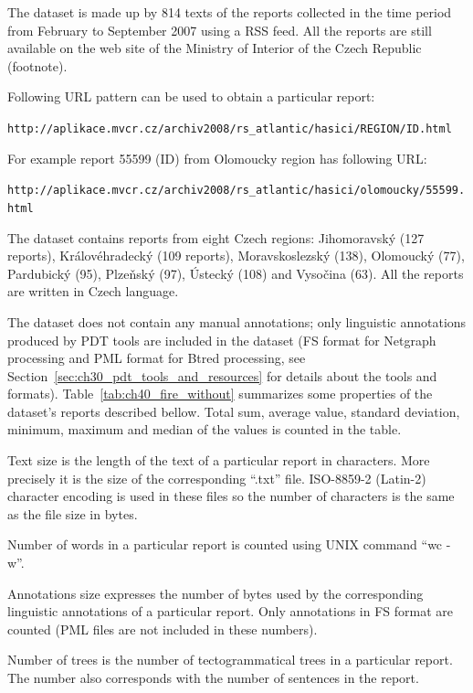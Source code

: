 The dataset is made up by 814 texts of the reports collected in the time period from February to September 2007 using a RSS feed. All the reports are still available on the web site of the Ministry of Interior of the Czech Republic (footnote). 

Following URL pattern can be used to obtain a particular report:


\begin{center}
\verb+http://aplikace.mvcr.cz/archiv2008/rs_atlantic/hasici/REGION/ID.html+
\end{center}

For example report 55599 (ID) from Olomoucky region has following URL:

\begin{center}
\verb+http://aplikace.mvcr.cz/archiv2008/rs_atlantic/hasici/olomoucky/55599.html+
\end{center}


The dataset contains reports from eight Czech regions: Jihomoravský (127 reports), Královéhradecký (109 reports), Moravskoslezský (138), Olomoucký (77), Pardubický (95), Plzeňský (97), Ústecký (108) and Vysočina (63). All the reports are written in Czech language. 

The dataset does not contain any manual annotations; only linguistic annotations produced by PDT tools are included in the dataset (FS format for Netgraph processing and PML format for Btred processing, see Section~\ref{sec:ch30_pdt_tools_and_resources} for details about the tools and formats). Table~\ref{tab:ch40_fire_without} summarizes some properties of the dataset’s reports described bellow.  Total sum, average value, standard deviation, minimum, maximum and median of the values is counted in the table.


Text size is the length of the text of a particular report in characters. More precisely it is the size of the corresponding ``.txt'' file. ISO-8859-2 (Latin-2) character encoding is used in these files so the number of characters is the same as the file size in bytes. 

Number of words in a particular report is counted using UNIX command ``wc -w''.

Annotations size expresses the number of bytes used by the corresponding linguistic annotations of a particular report. Only annotations in FS format are counted (PML files are not included in these numbers).

Number of trees is the number of tectogrammatical trees in a particular report. The number also corresponds with the number of sentences in the report.


